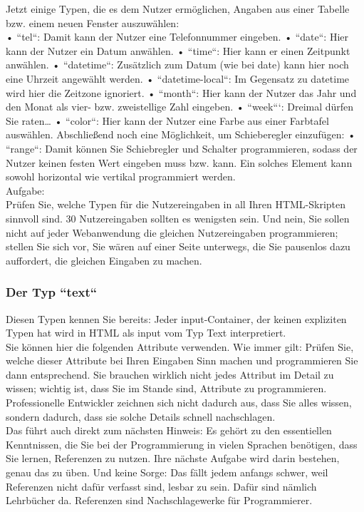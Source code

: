 Jetzt einige Typen, die es dem Nutzer ermöglichen, Angaben aus einer Tabelle bzw. einem neuen Fenster auszuwählen:\\

•	``tel``: Damit kann der Nutzer eine Telefonnummer eingeben.
•	``date``: Hier kann der Nutzer ein Datum anwählen.
•	``time``: Hier kann er einen Zeitpunkt anwählen.
•	``datetime``: Zusätzlich zum Datum (wie bei date) kann hier noch eine Uhrzeit angewählt werden.
•	``datetime-local``: Im Gegensatz zu datetime wird hier die Zeitzone ignoriert.
•	``month``: Hier kann der Nutzer das Jahr und den Monat als vier- bzw. zweistellige Zahl eingeben.
•	``week```: Dreimal dürfen Sie raten…
•	``color``: Hier kann der Nutzer eine Farbe aus einer Farbtafel auswählen.
Abschließend noch eine Möglichkeit, um Schieberegler einzufügen:
•	``range``: Damit können Sie Schiebregler und Schalter programmieren, sodass der Nutzer keinen festen Wert eingeben muss bzw. kann. Ein solches Element kann sowohl horizontal wie vertikal programmiert werden.\\

Aufgabe:\\

Prüfen Sie, welche Typen für die Nutzereingaben in all Ihren HTML-Skripten sinnvoll sind. 30 Nutzereingaben sollten es wenigsten sein. Und nein, Sie sollen nicht auf jeder Webanwendung die gleichen Nutzereingaben programmieren; stellen Sie sich vor, Sie wären auf einer Seite unterwegs, die Sie pausenlos dazu auffordert, die gleichen Eingaben zu machen.

\subsubsection{Der Typ ``text``}

Diesen Typen kennen Sie bereits: Jeder input-Container, der keinen expliziten Typen hat wird in HTML als input vom Typ Text interpretiert.\\

Sie können hier die folgenden Attribute verwenden. Wie immer gilt: Prüfen Sie, welche dieser Attribute bei Ihren Eingaben Sinn machen und programmieren Sie dann entsprechend. Sie brauchen wirklich nicht jedes Attribut im Detail zu wissen; wichtig ist, dass Sie im Stande sind, Attribute zu programmieren. Professionelle Entwickler zeichnen sich nicht dadurch aus, dass Sie alles wissen, sondern dadurch, dass sie solche Details schnell nachschlagen.\\

Das führt auch direkt zum nächsten Hinweis: Es gehört zu den essentiellen Kenntnissen, die Sie bei der Programmierung in vielen Sprachen benötigen, dass Sie lernen, Referenzen zu nutzen. Ihre nächste Aufgabe wird darin bestehen, genau das zu üben. Und keine Sorge: Das fällt jedem anfangs schwer, weil Referenzen nicht dafür verfasst sind, lesbar zu sein. Dafür sind nämlich Lehrbücher da. Referenzen sind Nachschlagewerke für Programmierer.\\

